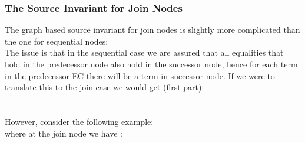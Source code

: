 \subsubsection*{The Source Invariant for Join Nodes}
The graph based source invariant for join nodes is slightly more complicated than the one for sequential nodes:\\
The issue is that in the sequential case we are assured that all equalities that hold in the predecessor node also hold in the successor node, hence for each term in the predecessor EC there will be a term in successor node.
If we were to translate this to the join case we would get (first part):\\
\\
\\
However, consider the following example:\\
 where at the join node we have :
